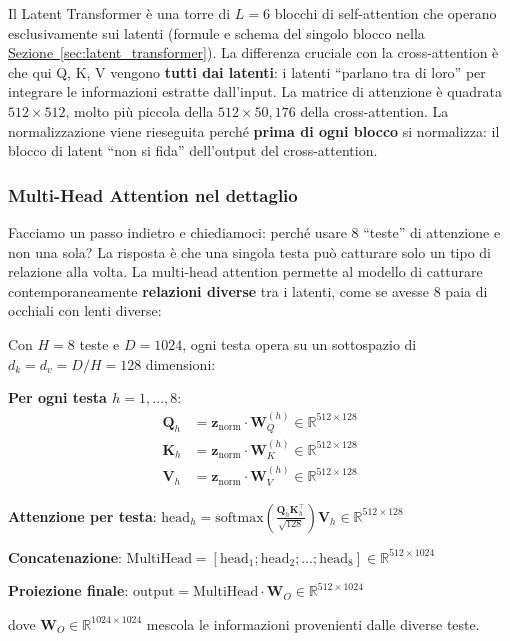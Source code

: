 \documentclass[12pt,a4paper]{article}
\begin{document}
Il Latent Transformer \`e una torre di $L = 6$ blocchi di self-attention che operano esclusivamente sui latenti (formule e schema del singolo blocco nella \hyperref[sec:latent_transformer]{Sezione~\ref*{sec:latent_transformer}}). La differenza cruciale con la cross-attention \`e che qui Q, K, V vengono \textbf{tutti dai latenti}: i latenti ``parlano tra di loro'' per integrare le informazioni estratte dall'input. La matrice di attenzione \`e quadrata $512 \times 512$, molto pi\`u piccola della $512 \times 50{,}176$ della cross-attention. La normalizzazione viene rieseguita perch\'e \textbf{prima di ogni blocco} si normalizza: il blocco di latent ``non si fida'' dell'output del cross-attention.

\subsubsection{Multi-Head Attention nel dettaglio} \label{sec:multi_head_detail}

Facciamo un passo indietro e chiediamoci: perch\'e usare 8 ``teste'' di attenzione e non una sola? La risposta \`e che una singola testa pu\`o catturare solo un tipo di relazione alla volta. La multi-head attention permette al modello di catturare contemporaneamente \textbf{relazioni diverse} tra i latenti, come se avesse 8 paia di occhiali con lenti diverse:

\begin{formulabox}
Con $H = 8$ teste e $D = 1024$, ogni testa opera su un sottospazio di $d_k = d_v = D / H = 128$ dimensioni:

\textbf{Per ogni testa $h = 1, \ldots, 8$}:
\begin{align*}
    \mathbf{Q}_h &= \mathbf{z}_{\text{norm}} \cdot \mathbf{W}_Q^{(h)} \in \mathbb{R}^{512 \times 128} \\
    \mathbf{K}_h &= \mathbf{z}_{\text{norm}} \cdot \mathbf{W}_K^{(h)} \in \mathbb{R}^{512 \times 128} \\
    \mathbf{V}_h &= \mathbf{z}_{\text{norm}} \cdot \mathbf{W}_V^{(h)} \in \mathbb{R}^{512 \times 128}
\end{align*}

\textbf{Attenzione per testa}: $\text{head}_h = \text{softmax}\!\left(\frac{\mathbf{Q}_h \mathbf{K}_h^\top}{\sqrt{128}}\right) \mathbf{V}_h \in \mathbb{R}^{512 \times 128}$

\textbf{Concatenazione}: $\text{MultiHead} = [\text{head}_1; \text{head}_2; \ldots; \text{head}_8] \in \mathbb{R}^{512 \times 1024}$

\textbf{Proiezione finale}: $\text{output} = \text{MultiHead} \cdot \mathbf{W}_O \in \mathbb{R}^{512 \times 1024}$

dove $\mathbf{W}_O \in \mathbb{R}^{1024 \times 1024}$ mescola le informazioni provenienti dalle diverse teste.
\end{formulabox}
\end{document}
